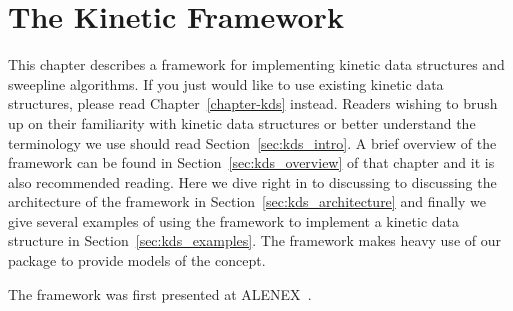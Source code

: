 
\chapter{The Kinetic Framework}
\label{chapter-kinetic}

%

\minitoc



\def\note#1{$\langle\langle${\bf #1}$\rangle\rangle$}

%

This chapter describes a framework for implementing kinetic data
structures and sweepline algorithms. If you just would like to use
existing kinetic data structures, please read
Chapter~\ref{chapter-kds} instead. Readers wishing to brush up on
their familiarity with kinetic data structures or better understand
the terminology we use should read Section~\ref{sec:kds_intro}.  A brief
overview of the framework can be found in
Section~\ref{sec:kds_overview} of that chapter and it is also
recommended reading. Here we dive right in to discussing to discussing
the architecture of the framework in Section~\ref{sec:kds_architecture}
and finally we give several examples of using the framework to
implement a kinetic data structure in Section~\ref{sec:kds_examples}. The
framework makes heavy use of our  package to
provide models of the  concept.

The framework was first presented at ALENEX~\cite{cgal:gkr-cfhm-04}.







